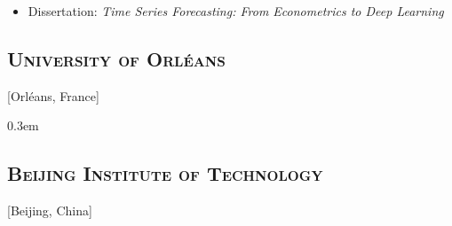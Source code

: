 \documentclass{mycv}
\begin{document}
\begin{itemize}
  \item Dissertation: \textit{Time Series Forecasting: From Econometrics to Deep Learning}
\end{itemize}

\vspace{-\parskip}

\subsection{\large \scshape University of Orl\'eans}[Orl\'eans, France]

\begin{positions}
  \itemsep 0.3em
\end{positions}



\vspace{-\parskip}

\subsection{\large \scshape Beijing Institute of Technology}[Beijing, China]

\begin{positions}
\end{positions}


\end{document}
